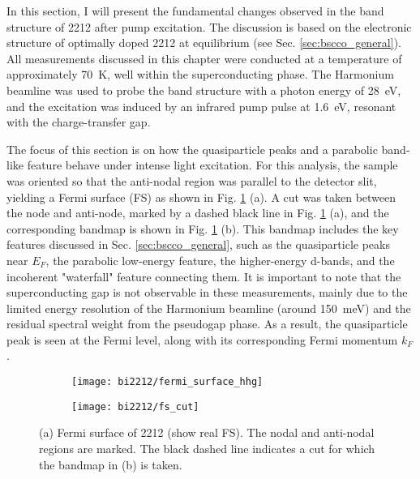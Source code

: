 In this section, I will present the fundamental changes observed in the band structure of 2212 after pump excitation.
The discussion is based on the electronic structure of optimally doped 2212 at equilibrium (see Sec. \ref{sec:bscco_general}).
All measurements discussed in this chapter were conducted at a temperature of approximately \qty{70}{\kelvin}, well within the superconducting phase.
The Harmonium beamline \cite{arrell_harmonium_2017} was used to probe the band structure with a photon energy of \qty{28}{\electronvolt}, and the excitation was induced by an infrared pump pulse at \qty{1.6}{\electronvolt}, resonant with the charge-transfer gap.

The focus of this section is on how the quasiparticle peaks and a parabolic band-like feature behave under intense light excitation.
For this analysis, the sample was oriented so that the anti-nodal region was parallel to the detector slit, yielding a Fermi surface (FS) as shown in Fig. \ref{fig:fs_cut} (a).
A cut was taken between the node and anti-node, marked by a dashed black line in Fig. \ref{fig:fs_cut} (a), and the corresponding bandmap is shown in Fig. \ref{fig:fs_cut} (b).
This bandmap includes the key features discussed in Sec. \ref{sec:bscco_general}, such as the quasiparticle peaks near $E_F$, the parabolic low-energy feature, the higher-energy  d-bands, and the incoherent "waterfall" feature connecting them.
It is important to note that the superconducting gap is not observable in these measurements, mainly due to the limited energy resolution of the Harmonium beamline (around \qty{150}{\milli\electronvolt}) and the residual spectral weight from the pseudogap phase.
As a result, the quasiparticle peak is seen at the Fermi level, along with its corresponding Fermi momentum $k_F$.

\begin{figure}[t]
	\centering
	\begin{subfigure}[b]{0.49\textwidth}
		\texttt{[image: bi2212/fermi\_surface\_hhg]}
		\caption{}
	\end{subfigure}
	\begin{subfigure}[b]{0.45\textwidth}
		\texttt{[image: bi2212/fs\_cut]}
		\caption{}
	\end{subfigure}
	\caption{(a) Fermi surface of 2212 (show real FS). The nodal and anti-nodal regions are marked. The black dashed line indicates a cut for which the bandmap in (b) is taken.}
	\label{fig:fs_cut}
\end{figure}

